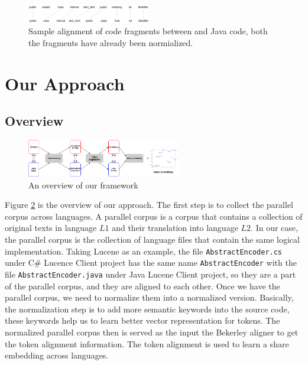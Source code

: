 \begin{figure}[t!]
	
	\includegraphics[width=0.48\textwidth]{alignment}
	\caption{Sample alignment of code fragments between  and Java code, both the fragments have already been normialized.}
	\label{fig:unsupervised_token_alignment}
\end{figure}
\section{Our Approach}
\subsection{Overview}

\begin{figure}[t!]
	\includegraphics[width=0.60\textwidth]{approach}
	\caption{An overview of our framework}
	\label{fig:approach}
\end{figure}


Figure \ref{fig:approach} is the overview of our approach. The first step is to collect the parallel corpus across languages.  A parallel corpus is a corpus that contains a collection of original texts in language \begin{math}L1\end{math} and their translation into language \begin{math}L2\end{math}. In our case, the parallel corpus is the collection of language files that contain the same logical implementation. Taking Lucene as an example, the file \texttt{AbstractEncoder.cs} under C\# Lucence Client project has the same name \texttt{AbstractEncoder} with the file \texttt{AbstractEncoder.java} under Java Lucene Client project, so they are a part of the parallel corpus, and they are aligned to each other. Once we have the parallel corpus, we need to normalize them into a normalized version. Basically, the normalization step is to add more semantic keywords into the source code, these keywords help us to learn better vector representation for tokens. The normalized parallel corpus then is served as the input the Bekerley aligner \cite{liang2006alignment} to get the token alignment information. The token alignment is used to learn a share embedding across languages.

